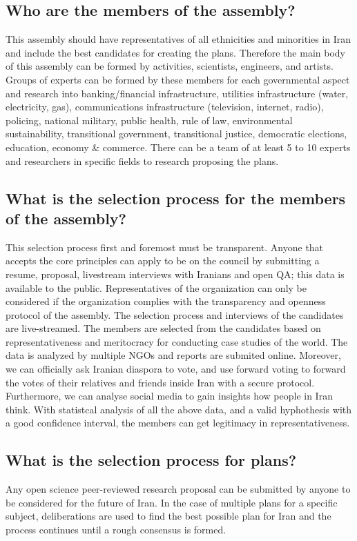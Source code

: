 \documentclass{IEEEtran}
\begin{document}
\begin{enumerate}
\subsection{Who are the members of the assembly?}
This assembly should have representatives of all ethnicities and minorities in Iran and include the best candidates for creating the plans.
 Therefore the main body of this assembly can be formed by activities, scientists, engineers, and artists.
  Groups of experts can be formed by these members for each governmental aspect and research into 
  banking/financial infrastructure, utilities infrastructure (water, electricity, gas), communications infrastructure (television, internet, radio), policing, 
  national military, public health, rule of law, environmental sustainability, transitional government,
   transitional justice, democratic elections, education, economy \& commerce.
There can be a team of at least 5 to 10 experts and researchers in specific fields to research proposing the plans.

\subsection{What is the selection process for the members of the assembly?}
This selection process first and foremost must be transparent. Anyone that accepts the core principles can apply to be on the council by submitting a
 resume, proposal, livestream interviews with Iranians and open QA; this data is available to the public. Representatives of the organization can only be considered if the organization complies with the transparency and openness protocol of the assembly. 
 The selection process and interviews of the candidates are live-streamed. The members are selected from the candidates based on representativeness and meritocracy for conducting case studies of the world. 
 The data is analyzed by multiple NGOs and reports are submited online. 
 Moreover, we can officially ask Iranian diaspora to vote, and use forward voting to forward the votes of their relatives and friends inside Iran with a secure protocol.
 Furthermore, we can analyse social media to gain insights how people in Iran think.
 With statistcal analysis of all the above data, and a valid hyphothesis with a good confidence interval, the members can get legitimacy in representativeness.
\subsection{What is the selection process for plans?}
Any open science peer-reviewed research proposal can be submitted by anyone to be considered for the future of Iran. In the case of multiple plans for a specific subject, deliberations are used to find the best possible plan for Iran and the process continues until a rough consensus is formed.


\end{enumerate}
\end{document}
